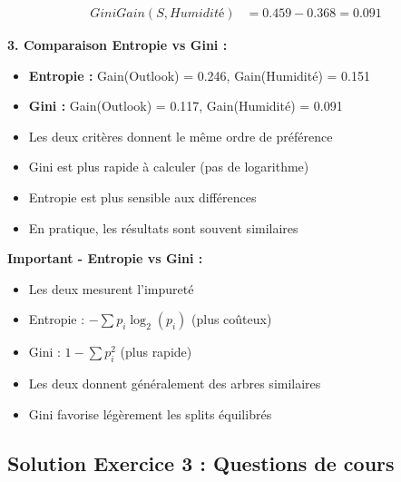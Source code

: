 \documentclass[11pt,a4paper]{article}
\begin{document}
\begin{solutionbox}
\begin{align*}
GiniGain(S, Humidité) &= 0.459 - 0.368 = 0.091
\end{align*}

\textbf{3. Comparaison Entropie vs Gini :}
\begin{itemize}
    \item \textbf{Entropie :} Gain(Outlook) = 0.246, Gain(Humidité) = 0.151
    \item \textbf{Gini :} Gain(Outlook) = 0.117, Gain(Humidité) = 0.091
    \item Les deux critères donnent le même ordre de préférence
    \item Gini est plus rapide à calculer (pas de logarithme)
    \item Entropie est plus sensible aux différences
    \item En pratique, les résultats sont souvent similaires
\end{itemize}
\end{solutionbox}

\begin{importantbox}
\textbf{Important - Entropie vs Gini :}
\begin{itemize}
    \item Les deux mesurent l'impureté
    \item Entropie : $-\sum p_i \log_2(p_i)$ (plus coûteux)
    \item Gini : $1 - \sum p_i^2$ (plus rapide)
    \item Les deux donnent généralement des arbres similaires
    \item Gini favorise légèrement les splits équilibrés
\end{itemize}
\end{importantbox}

\subsection{Solution Exercice 3 : Questions de cours}
\end{document}
